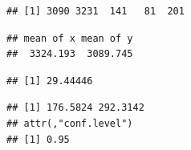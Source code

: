 \documentclass[
]{book}
\newenvironment{Shaded}{\begin{snugshade}}{\end{snugshade}}
\newcommand{\DataTypeTok}[1]{\textcolor[rgb]{0.13,0.29,0.53}{#1}}
\newcommand{\KeywordTok}[1]{\textcolor[rgb]{0.13,0.29,0.53}{\textbf{#1}}}
\newcommand{\NormalTok}[1]{#1}
\newcommand{\OperatorTok}[1]{\textcolor[rgb]{0.81,0.36,0.00}{\textbf{#1}}}
\newcommand{\OtherTok}[1]{\textcolor[rgb]{0.56,0.35,0.01}{#1}}
\newcommand{\StringTok}[1]{\textcolor[rgb]{0.31,0.60,0.02}{#1}}
\begin{document}
\begin{verbatim}
## [1] 3090 3231  141   81  201
\end{verbatim}

\begin{Shaded}
\end{Shaded}

\begin{verbatim}
## mean of x mean of y 
##  3324.193  3089.745
\end{verbatim}

\begin{Shaded}
\end{Shaded}

\begin{verbatim}
## [1] 29.44446
\end{verbatim}

\begin{Shaded}
\end{Shaded}

\begin{verbatim}
## [1] 176.5824 292.3142
## attr(,"conf.level")
## [1] 0.95
\end{verbatim}
\end{document}
